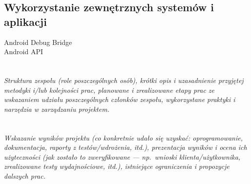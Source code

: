 \documentclass[polish,12pt]{aghthesis}
\begin{document}
\subsection{Wykorzystanie zewnętrznych systemów i aplikacji}
Android Debug Bridge\\
Android API

\section{\SectionTitleWorkOrganization}
\label{sec:organizacja-pracy}
\emph{Struktura zespołu (role poszczególnych osób), krótki opis i
  uzasadnienie przyjętej metodyki i/lub kolejności prac, planowane i
  zrealizowane etapy prac ze wskazaniem udziału poszczególnych
  członków zespołu, wykorzystane praktyki i narzędzia w zarządzaniu
  projektem.}  %

\section{\SectionTitleResults}
\label{sec:wyniki-projektu}
\emph{Wskazanie wyników projektu (co konkretnie udało się uzyskać:
  oprogramowanie, dokumentacja, raporty z testów/wdrożenia, itd.), prezentacja wyników
  i ocena ich użyteczności (jak zostało to zweryfikowane --- np.\ wnioski
  klienta/użytkownika, zrealizowane testy wydajnościowe, itd.),
  istniejące ograniczenia i propozycje dalszych prac.}  %


\nocite{artykul2011,ksiazka2011,narzedzie2011,projekt2011}


\end{document}
